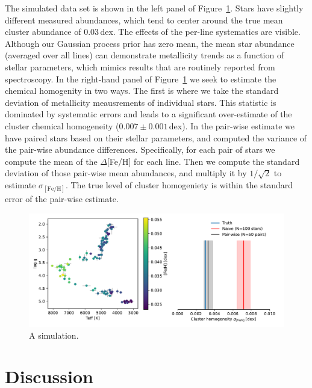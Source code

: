 \documentclass[modern]{aastex631}
\begin{document}
The simulated data set is shown in the left panel of Figure~\ref{fig:simulation}. Stars have slightly different measured abundances, which tend to center around the true mean cluster abundance of 0.03\,dex. The effects of the per-line systematics are visible. Although our Gaussian process prior has zero mean, the mean star abundance (averaged over all lines) can demonstrate metallicity trends as a function of stellar parameters, which mimics results that are routinely reported from spectroscopy. In the right-hand panel of Figure~\ref{fig:simulation} we seek to estimate the chemical homogenity in two ways. The first is where we take the standard deviation of metallicity meausrements of individual stars. This statistic is dominated by systematic errors and leads to a significant over-estimate of the cluster chemical homogeneity ($0.007 \pm 0.001$\,dex). In the pair-wise estimate we have paired stars based on their stellar parameters, and computed the variance of the pair-wise abundance differences. Specifically, for each pair of stars we compute the mean of the $\Delta$[Fe/H] for each line. Then we compute the standard deviation of those pair-wise mean abundances, and multiply it by $1/\sqrt{2}$ to estimate $\sigma_{\mathrm{[Fe/H]}}$. The true level of cluster homogeniety is within the standard error of the pair-wise estimate.\\


\begin{figure}
    \includegraphics*[width=\textwidth]{simulation.pdf}
    \caption{A simulation.\label{fig:simulation}}
\end{figure}


\section{Discussion}
\end{document}
